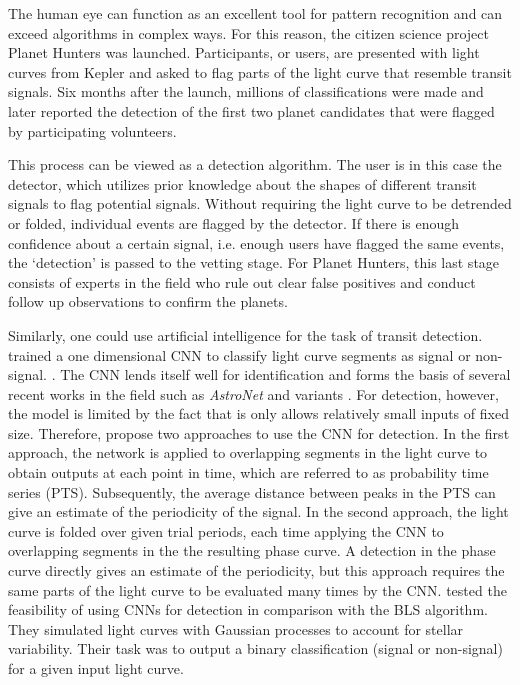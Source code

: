 The human eye can function as an excellent tool for pattern recognition and can exceed algorithms in complex ways. For this reason, the citizen science project Planet Hunters was launched. Participants, or users, are presented with light curves from Kepler and asked to flag parts of the light curve that resemble transit signals. Six months after the launch, millions of classifications were made and later \cite{fischer2012planet} reported the detection of the first two planet candidates that were flagged by participating volunteers.

This process can be viewed as a detection algorithm. The user is in this case the detector, which utilizes prior knowledge about the shapes of different transit signals to flag potential signals. Without requiring the light curve to be detrended or folded, individual events are flagged by the detector. If there is enough confidence about a certain signal, i.e. enough users have flagged the same events, the `detection' is passed to the vetting stage. For Planet Hunters, this last stage consists of experts in the field who rule out clear false positives and conduct follow up observations to confirm the planets. 

Similarly, one could use artificial intelligence for the task of transit detection. \cite{pearson2018searching} trained a one dimensional CNN to classify light curve segments as signal or non-signal. . The CNN lends itself well for identification and forms the basis of several recent works in the field such as \textit{AstroNet} \citep{shallue2018identifying} and variants \citep{ansdell2018scientific, dattilo2019identifying, koning2019reducing, yu2019identifying, osborn2020rapid}. For detection, however, the model is limited by the fact that is only allows relatively small inputs of fixed size. Therefore, \cite{pearson2018searching} propose two approaches to use the CNN for detection. In the first approach, the network is applied to overlapping segments in the light curve to obtain outputs at each point in time, which are referred to as probability time series (PTS). Subsequently, the average distance between peaks in the PTS can give an estimate of the periodicity of the signal. In the second approach, the light curve is folded over given trial periods, each time applying the CNN to overlapping segments in the the resulting phase curve. A detection in the phase curve directly gives an estimate of the periodicity, but this approach requires the same parts of the light curve to be evaluated many times by the CNN. \cite{zucker2018shallow} tested the feasibility of using CNNs for detection in comparison with the BLS algorithm. They simulated light curves with Gaussian processes to account for stellar variability. Their task was to output a binary classification (signal or non-signal) for a given input light curve. 

